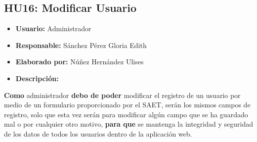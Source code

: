 \subsection{HU16: Modificar Usuario}
\begin{itemize}
	\item \textbf{Usuario:} Administrador
	\item \textbf{Responsable:} Sánchez Pérez Gloria Edith
	\item \textbf{Elaborado por:} Núñez Hernández Ulises
	\item \textbf{Descripción:}
\end{itemize}
\textbf{Como} administrador \textbf{debo de poder} modificar el registro de un usuario por medio de un formulario proporcionado por el SAET, serán los mismos campos de registro, solo que esta vez serán para modificar algún campo que se ha guardado mal o por cualquier otro motivo, \textbf{para que} se mantenga la integridad y seguridad de los datos de todos los usuarios dentro de la aplicación web. 